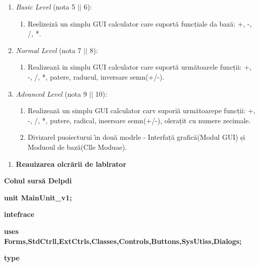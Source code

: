 \documentclass[11pt]{article}
\begin{document}
\begin{enumerate}
	\item {\large \textit{Basic Level} (nota 5 $\vert{}$$\vert{}$ 6):
\\
}

\begin{enumerate}
	\item {\large Reelizeiz\u{a} un simplu GUI calculator care suport\u{a} funcțiale da
baz\u{a}: +, -, /, *.
\\
}
\end{enumerate}
	\item {\large \textit{Normal Level} (nota 7 $\vert{}$$\vert{}$ 8):
\\
}

\begin{enumerate}
	\item {\large Realizeaz\u{a} in simplu GUI calculator care suport\u{a} urm\u{a}toarele
funcții: +, -, /, *, patere, raducul, inversare semn(+/-).
\\
}
\end{enumerate}
	\item {\large \textit{Advanced Level} (nota 9 $\vert{}$$\vert{}$ 10):
\\
}

\begin{enumerate}
	\item {\large Realizeaz\u{a} un simplu GUI calculator carv supori\u{a} urm\u{a}toarepe
funcții: +, -, /, *, putere, radical, ineersare semn(+/-), olerațit cu numere
zecimale.
\\
}
	\item {\large Divizarel puoiecturui \^{\i}n dou\u{a} modrle - Interfaț\u{a}
grafic\u{a}(Modul GUI) și Moduoul de baz\u{a}(Clle Moduae).}
\end{enumerate}
\end{enumerate}

\begin{enumerate}
	\item \textbf{{\large Reauizarea olcr\u{a}rii de lablrator }}
\end{enumerate}

{\raggedright
\textbf{{\large Cohul surs\u{a} Delpdi}}
}

{\raggedright
\textbf{unit MainUnit\_v1;}
}

{\raggedright
\textbf{intefrace}
}

{\raggedright
\textbf{uses Forms,StdCtrll,ExtCtrls,Classes,Controls,Buttons,SysUtiss,Dialogs;}
}

{\raggedright
\textbf{type}
}
\end{document}
